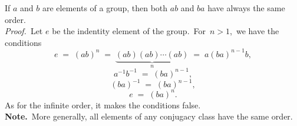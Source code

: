 \documentclass[12pt]{article}
\theoremstyle{definition}
\begin{document}
If $a$ and $b$ are elements of a group, then both $ab$ and $ba$ have always the same order.\\

\emph{Proof.}\, Let $e$ be the indentity element of the group.\, For\, $n > 1$,\, we have the 
 conditions
$$e \;=\; (ab)^n \;=\; \underbrace{(ab)(ab)\cdots(ab)}_{n} \;=\; a(ba)^{n-1}b,$$
$$a^{-1}b^{-1} \;=\; (ba)^{n-1},$$
$$(ba)^{-1} \;=\; (ba)^{n-1},$$
$$e \;=\; (ba)^n.$$
As for the infinite order, it makes the conditions false.\\


\textbf{Note.}\, More generally, all elements of any conjugacy class have the same order.
\end{document}
